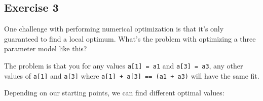 \documentclass[]{book}
\newenvironment{Shaded}{\begin{snugshade}}{\end{snugshade}}
\newcommand{\CommentTok}[1]{\textcolor[rgb]{0.56,0.35,0.01}{\textit{#1}}}
\newcommand{\ControlFlowTok}[1]{\textcolor[rgb]{0.13,0.29,0.53}{\textbf{#1}}}
\newcommand{\DataTypeTok}[1]{\textcolor[rgb]{0.13,0.29,0.53}{#1}}
\newcommand{\DecValTok}[1]{\textcolor[rgb]{0.00,0.00,0.81}{#1}}
\newcommand{\KeywordTok}[1]{\textcolor[rgb]{0.13,0.29,0.53}{\textbf{#1}}}
\newcommand{\NormalTok}[1]{#1}
\newcommand{\OperatorTok}[1]{\textcolor[rgb]{0.81,0.36,0.00}{\textbf{#1}}}
\newcommand{\StringTok}[1]{\textcolor[rgb]{0.31,0.60,0.02}{#1}}
\theoremstyle{plain}
\theoremstyle{remark}
\theoremstyle{definition}
\theoremstyle{definition}
\theoremstyle{definition}
\theoremstyle{remark}
\begin{document}
\hypertarget{exercise-3-48}{%
\subsection{Exercise 3}\label{exercise-3-48}}

One challenge with performing numerical optimization is that it's only
guaranteed to find a local optimum. What's the problem with optimizing a
three parameter model like this?

\begin{Shaded}
\end{Shaded}

The problem is that you for any values \texttt{a{[}1{]}\ =\ a1} and
\texttt{a{[}3{]}\ =\ a3}, any other values of \texttt{a{[}1{]}} and
\texttt{a{[}3{]}} where \texttt{a{[}1{]}\ +\ a{[}3{]}\ ==\ (a1\ +\ a3)}
will have the same fit.

\begin{Shaded}
\end{Shaded}

Depending on our starting points, we can find different optimal values:

\begin{Shaded}
\end{Shaded}
\end{document}
